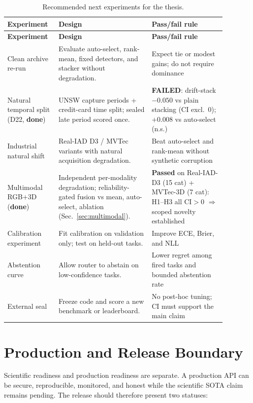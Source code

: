 \documentclass[11pt,titlepage]{article}
\begin{document}
\begin{longtable}{L{0.18\linewidth}L{0.39\linewidth}L{0.31\linewidth}}
\caption{Recommended next experiments for the thesis.}\label{tab:next-exp}\\
\toprule
\textbf{Experiment} & \textbf{Design} & \textbf{Pass/fail rule} \\
\midrule
\endfirsthead
\toprule
\textbf{Experiment} & \textbf{Design} & \textbf{Pass/fail rule} \\
\midrule
\endhead
Clean archive re-run & Evaluate auto-select, rank-mean, fixed detectors, and stacker without degradation. & Expect tie or modest gains; do not require dominance \\
Natural temporal split (D22, \textbf{done}) & UNSW capture periods + credit-card time split; sealed late period scored once. & \textbf{FAILED}: drift-stack $-0.050$ vs plain stacking (CI excl.\ 0); $+0.008$ vs auto-select (n.s.) \\
Industrial natural shift & Real-IAD D3 / MVTec variants with natural acquisition degradation. & Beat auto-select and rank-mean without synthetic corruption \\
Multimodal RGB$+$3D (\textbf{done}) & Independent per-modality degradation; reliability-gated fusion vs mean, auto-select, ablation (Sec.~\ref{sec:multimodal}). & \textbf{Passed} on Real-IAD-D3 (15 cat) + MVTec-3D (7 cat): H1--H3 all CI$>$0 $\Rightarrow$ scoped novelty established \\
Calibration experiment & Fit calibration on validation only; test on held-out tasks. & Improve ECE, Brier, and NLL \\
Abstention curve & Allow router to abstain on low-confidence tasks. & Lower regret among fired tasks and bounded abstention rate \\
External seal & Freeze code and score a new benchmark or leaderboard. & No post-hoc tuning; CI must support the main claim \\
\bottomrule
\end{longtable}

\section{Production and Release Boundary}

Scientific readiness and production readiness are separate. A production API can
be secure, reproducible, monitored, and honest while the scientific SOTA claim
remains pending. The release should therefore present two statuses:
\end{document}
